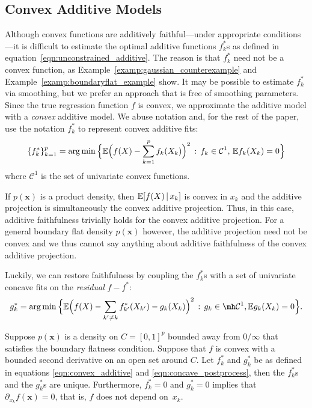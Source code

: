 \subsection{Convex Additive Models}

Although convex functions are additively faithful---under appropriate conditions---it is difficult to
estimate the optimal additive functions $f^*_k$s as defined in
equation~\eqref{eqn:unconstrained_additive}.  The reason is that $f^*_k$ need not be
a convex function, as Example~\ref{examp:gaussian_counterexample} and Example~\ref{examp:boundaryflat_example} 
show. It may be possible to estimate $f^*_k$ via smoothing, but we prefer an approach that is free of smoothing parameters. 
Since the true regression function $f$ is convex, we approximate the additive model with a \emph{convex} additive model. We abuse notation and, for the rest of the paper, use the notation $f^*_k$ to represent convex additive fits:
\begin{equation}
\label{eqn:convex_additive}
\{ f^*_k \}_{k=1}^p = \arg\min \Big \{ 
    {\mathbb E}\Bigl( f(X) - \sum_{k=1}^p f_k(X_k) \Bigr)^2 \,:\, f_k \in \mathcal{C}^1, \, {\mathbb E} f_k(X_k) = 0 \Big \}
\end{equation}
where $\mathcal{C}^1$ is the set of univariate convex functions. 

If $p(\mathbf{x})$ is a product density, then ${\mathbb E}[ f(X) {\,|\,} x_k]$
is convex in $x_k$ and the additive projection is simultaneously the
convex additive projection. Thus, in this case, additive faithfulness
trivially holds for the convex additive projection.  For a general
boundary flat density $p(\mathbf{x})$ however, the additive projection
need not be convex and we thus cannot say anything about additive
faithfulness of the convex additive projection.

Luckily, we can restore faithfulness by coupling the $f^*_k$s with a set of univariate concave fits on the \emph{residual} $f - f^*$:
\begin{equation}
\label{eqn:concave_postprocess}
g^*_k = \arg\min \Big\{
   \E\Bigl( f(X) - \sum_{k' \neq k} f^*_{k'}(X_{k'}) - g_k(X_k) \Bigr)^2
    \,:\, g_k \in \mh \mathcal{C}^1, \E g_k(X_k) = 0 
  \Big\}.
\end{equation}


\begin{theorem}
\label{thm:acdc_faithful}
Suppose $p(\mathbf{x})$ is a density on $C=[0,1]^p$ bounded away from
$0/\infty$ that satisfies the boundary flatness condition. Suppose
that $f$ is convex with a bounded second derivative on an open set
around $C$. Let $f^*_k$ and $g^*_k$ be as defined in equations
\eqref{eqn:convex_additive} and \eqref{eqn:concave_postprocess}, then
the $f^*_k$s and the $g^*_k$s are unique. Furthermore, $f^*_k = 0$
and $g^*_k = 0$ implies that $\partial_{x_k} f(\mathbf{x}) = 0$, that
is, $f$ does not depend on~$x_k$.
\end{theorem}

